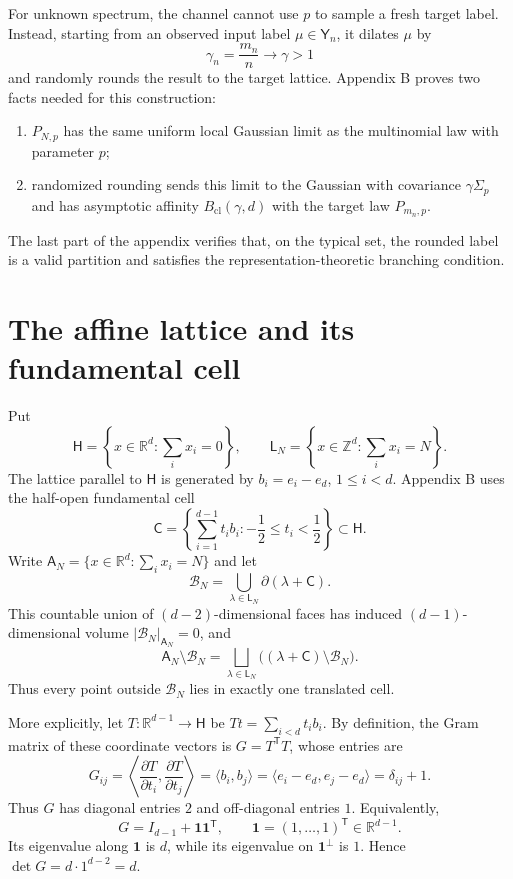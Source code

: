 \documentclass[11pt]{article}
\newcommand{\R}{\mathbb R}
\newcommand{\Bcl}{B_{\mathrm{cl}}}
\newcommand{\htile}{\mathsf H}
\begin{document}
For unknown spectrum, the channel cannot use $p$ to sample a fresh target
label.  Instead, starting from an observed input label $\mu\in\mathsf Y_n$,
it dilates $\mu$ by
\[
  \gamma_n=\frac{m_n}{n}\longrightarrow\gamma>1
\]
and randomly rounds the result to the target lattice.  Appendix B proves two
facts needed for this construction:
\begin{enumerate}
  \item $P_{N,p}$ has the same uniform local Gaussian limit as the
  multinomial law with parameter $p$;
  \item randomized rounding sends this limit to the Gaussian with covariance
  $\gamma\Sigma_p$ and has asymptotic affinity $\Bcl(\gamma,d)$ with the
  target law $P_{m_n,p}$.
\end{enumerate}
The last part of the appendix verifies that, on the typical set, the rounded
label is a valid partition and satisfies the representation-theoretic
branching condition.

\section{The affine lattice and its fundamental cell}

Put
\[
  \htile=\left\{x\in\R^d:\sum_i x_i=0\right\},
  \qquad
  \mathsf L_N=\left\{x\in\mathbb Z^d:\sum_i x_i=N\right\}.
\]
The lattice parallel to $\htile$ is generated by
$b_i=e_i-e_d$, $1\leq i<d$.  Appendix B uses the half-open fundamental cell
\begin{equation}\label{eq:cell}
  \mathsf C
  =\left\{\sum_{i=1}^{d-1}t_i b_i:
     -\frac12\leq t_i<\frac12\right\}\subset\htile.
\end{equation}
Write $\mathsf A_N=\{x\in\R^d:\sum_i x_i=N\}$ and let
\[
  \mathcal B_N
  =\bigcup_{\lambda\in\mathsf L_N}\partial(\lambda+\mathsf C).
\]
This countable union of $(d-2)$-dimensional faces has induced
$(d-1)$-dimensional volume $|\mathcal B_N|_{\mathsf A_N}=0$, and
\[
  \mathsf A_N\setminus\mathcal B_N
  =\bigsqcup_{\lambda\in\mathsf L_N}
   \bigl((\lambda+\mathsf C)\setminus\mathcal B_N\bigr).
\]
Thus every point outside $\mathcal B_N$ lies in exactly one translated cell.

More explicitly, let $T:\R^{d-1}\to\htile$ be
$Tt=\sum_{i<d}t_i b_i$.  By definition, the Gram matrix of these coordinate
vectors is $G=T^{\mathsf T}T$, whose entries are
\[
  G_{ij}
  =\left\langle\frac{\partial T}{\partial t_i},
                   \frac{\partial T}{\partial t_j}\right\rangle
  =\langle b_i,b_j\rangle
  =\langle e_i-e_d,e_j-e_d\rangle
  =\delta_{ij}+1.
\]
Thus $G$ has diagonal entries $2$ and off-diagonal entries $1$.  Equivalently,
\[
  G=I_{d-1}+\mathbf 1\mathbf 1^{\mathsf T},
  \qquad \mathbf 1=(1,\ldots,1)^{\mathsf T}\in\R^{d-1}.
\]
Its eigenvalue along $\mathbf 1$ is $d$, while its eigenvalue on
$\mathbf 1^\perp$ is $1$.  Hence
$\det G=d\cdot1^{d-2}=d$.
\end{document}
